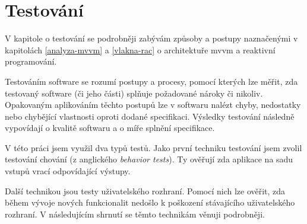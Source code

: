\chapter{Testování}\label{testovani}



V kapitole o testování se podrobněji zabývám způsoby a postupy naznačenými v kapitolách \ref{analyza-mvvm} a \ref{vlakna-rac} o architektuře \acrshort{mvvm} a reaktivní programování.

Testováním software se rozumí postupy a procesy, pomocí kterých lze měřit, zda testovaný software (či jeho části) splňuje požadované nároky či nikoliv.
Opakovaným aplikováním těchto postupů lze v softwaru nalézt chyby, nedostatky nebo chybějící vlastnosti oproti dodané specifikaci.
Výsledky testování následně vypovídají o kvalitě softwaru a o míře splnění specifikace. \cite{software-testing-definition}

\bigskip

V této práci jsem využil dva typů testů.
Jako první techniku testování jsem zvolil testování chování (z anglického \textit{behavior tests}).
Ty ověřují zda aplikace na sadu vstupů vrací odpovídající výstupy.

Další technikou jsou testy uživatelského rozhraní.
Pomocí nich lze ověřit, zda během vývoje nových funkcionalit nedošlo k poškození stávajícího uživatelského rozhraní.
V následujícím shrnutí se těmto technikám věnuji podrobněji.









